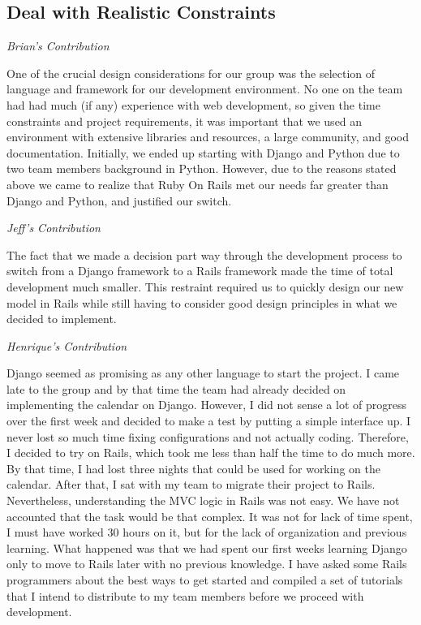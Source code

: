 \documentclass[11pt]{article}
\begin{document}
\subsection{Deal with Realistic Constraints}

\textit{Brian's Contribution}

One of the crucial design considerations for our group was the selection of language and framework for our development environment. No one on the team had had much (if any) experience with web development, so given the time constraints and project requirements, it was important that we used an environment with extensive libraries and resources, a large community, and good documentation. Initially, we ended up starting with Django and Python due to two team members background in Python. However, due to the reasons stated above we came to realize that Ruby On Rails met our needs far greater than Django and Python, and justified our switch. 

\textit{Jeff's Contribution}

The fact that we made a decision part way through the development process to switch from a Django framework to a Rails framework made the time of total development much smaller.  This restraint required us to quickly design our new model in Rails while still having to consider good design principles in what we decided to implement.

\textit{Henrique's Contribution}

Django seemed as promising as any other language to start the project. I came late to the group and by that time the team had already decided on implementing the calendar on Django. However, I did not sense a lot of progress over the first week and decided to make a test by putting a simple interface up. I never lost so much time fixing configurations and not actually coding. Therefore, I decided to try on Rails, which took me less than half the time to do much more. By that time, I had lost three nights that could be used for working on the calendar. After that, I sat with my team to migrate their project to Rails. Nevertheless, understanding the MVC logic in Rails was not easy. We have not accounted that the task would be that complex. It was not for lack of time spent, I must have worked 30 hours on it, but for the lack of organization and previous learning. What happened was that we had spent our first weeks learning Django only to move to Rails later with no previous knowledge. I have asked some Rails programmers about the best ways to get started and compiled a set of tutorials that I intend to distribute to my team members before we proceed with development.
\end{document}
